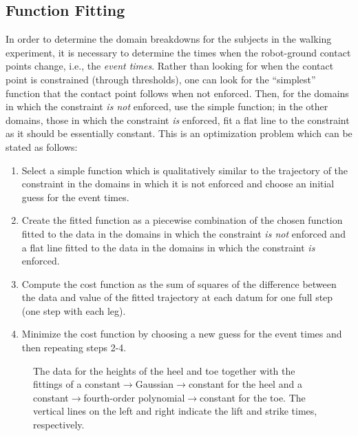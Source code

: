\subsection{Function Fitting} In order to determine the domain breakdowns for the subjects in the walking experiment, it is necessary to determine the times when the robot-ground contact points change, i.e., the {\em event times}. Rather than looking for when the contact point is constrained (through thresholds), one can look for the ``simplest'' function that the contact point follows when not enforced. Then, for the domains in which the constraint {\em is not} enforced, use the simple function; in the other domains, those in which the constraint {\em is} enforced, fit a flat line to the constraint as it should be essentially constant. This is an optimization problem which can be stated as follows:
\begin{enumerate}
  \item{Select a simple function which is qualitatively similar to the trajectory of the constraint in the domains in which it is not enforced and choose an initial guess for the event times.}
  \item{Create the fitted function as a piecewise combination of the chosen function fitted to the data in the domains in which the constraint {\em is not} enforced and a flat line fitted to the data in the domains in which the constraint {\em is} enforced.}
  \item{Compute the cost function as the sum of squares of the difference between the data and value of the fitted trajectory at each datum for one full step (one step with each leg).}
  \item{Minimize the cost function by choosing a new guess for the event times and then repeating steps 2-4.}
\end{enumerate}

\begin{figure}[t!]
  \centering
  \caption{The data for the heights of the heel and toe together with the fittings of a constant$\to$Gaussian$\to$constant for the heel and a constant$\to$fourth-order polynomial$\to$constant for the toe. The vertical lines on the left and right indicate the lift and strike times, respectively.}
  \label{fig:heeltoefit}
\end{figure}


